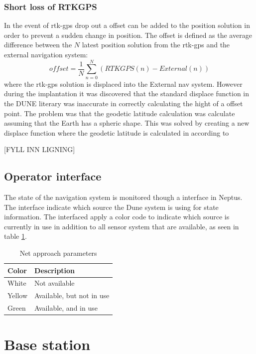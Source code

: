 \subsubsection{Short loss of RTKGPS}\label{ss:ShortLoss}
In the event of \gls{rtk-gps} drop out a offset can be added to the position solution in order to prevent a sudden change in position. The offset is defined as the average difference between the $N$ latest position solution from the \gls{rtk-gps} and the external navigation system:
\begin{equation}
offset = \frac{1}{N}\sum_{n=0}^N(RTKGPS(n)-External(n))
\end{equation}
where the \gls{rtk-gps} solution is displaced into the External nav system. However during the implantation it was discovered that the standard displace function in the DUNE literary was inaccurate in correctly calculating the hight of a offset point. The problem was that the geodetic latitude calculation was calculate assuming that the Earth has a spheric shape. This was solved by creating a new displace function where the geodetic latitude is calculated in according to

[FYLL INN LIGNING]


\subsection{Operator interface}
The state of the navigation system is monitored though a interface in Neptus. The interface indicate which source the Dune system is using for state information. The interfaced apply a color code to indicate which source is currently in use in addition to all sensor system that are available, as seen in table \ref{Tb:Color Code}.
\begin{table}[H]
\begin{center}
    \begin{tabular}{ | l | l |}
    \hline
    \textbf{Color} & \textbf{Description} \\ \hline
    White & Not available \\ \hline
    Yellow & Available, but not in use \\ \hline
    Green & Available, and in use \\ \hline
    \end{tabular}
\end{center}
\caption{Net approach parameters }
\label{Tb:Color Code}
\end{table}
\section{Base station}

